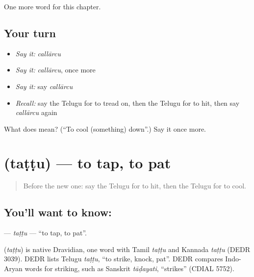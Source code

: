 \begin{grammarlens}[title={What you've built}]
One more word for this chapter.
\end{grammarlens}

\subsection*{Your turn}
\begin{itemize}
\raggedright
  \item \emph{Say it:} \emph{callārcu}
  \item \emph{Say it:} \emph{callārcu}, once more
  \item \emph{Say it:} say \emph{callārcu}
  \item \emph{Recall:} say the Telugu for to tread on, then the Telugu for to hit, then say \emph{callārcu} again
\end{itemize}

\begin{tcolorbox}[breakable,colback=teal!4,colframe=teal!35!black,title={Before you move on}]
What does  mean? (\textquotedblleft{}To cool (something) down\textquotedblright{}.) Say it once more.
\end{tcolorbox}
\section[\texorpdfstring{\te{తట్టు} (taṭṭu)}{తట్టు (taṭṭu)}]{ (taṭṭu) — to tap, to pat}

\label{lesson:TE-C207-tattu}



\begin{quote}
Before the new one: say the Telugu for to hit, then the Telugu for to cool.
\end{quote}

\subsection*{You'll want to know: }
\textbf{} — \emph{taṭṭu} — \textquotedblleft{}to tap, to pat\textquotedblright{}.

\begin{cousinweb}
\textbf{} (\emph{taṭṭu}) is native Dravidian, one word with Tamil \emph{taṭṭu} and Kannada \emph{taṭṭu} (DEDR 3039). DEDR lists Telugu \emph{taṭṭu}, \textquotedblleft{}to strike, knock, pat\textquotedblright{}. DEDR compares Indo-Aryan words for striking, such as Sanskrit \emph{tāḍayati}, \textquotedblleft{}strikes\textquotedblright{} (CDIAL 5752).
\end{cousinweb}

